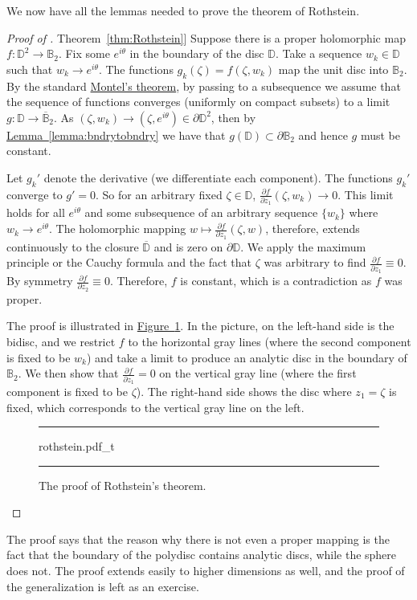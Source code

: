 \documentclass[12pt,openany]{book}
\newcommand{\D}{{\mathbb{D}}}
\newcommand{\bB}{{\mathbb{B}}}
\theoremstyle{plain}
\theoremstyle{remark}
\theoremstyle{definition}
\newenvironment{myfig}{%
\begin{figure}[h!t]
\noindent\rule{\textwidth}{0.5pt}\vspace{12pt}\par\centering}%
{\par\noindent\rule{\textwidth}{0.5pt}
\end{figure}}
\theoremstyle{exercise}
\theoremstyle{example}
\newcommand{\figureref}[1]{\hyperref[#1]{Figure~\ref*{#1}}}
\newcommand{\thmref}[1]{\hyperref[#1]{Theorem~\ref*{#1}}}
\newcommand{\lemmaref}[1]{\hyperref[#1]{Lemma~\ref*{#1}}}
\begin{document}
We now have all the lemmas needed to prove the theorem of Rothstein.

\begin{proof}[Proof of \thmref{thm:Rothstein}]
Suppose there is a proper holomorphic map $f \colon \D^2
\to \bB_2$.
Fix some $e^{i\theta}$ in the boundary of the disc $\D$.  Take a sequence
$w_k \in \D$ such that $w_k \to e^{i\theta}$.   The functions
$g_k(\zeta) =  f(\zeta,w_k)$ map the unit disc into $\bB_2$.  By the standard
\hyperref[thm:onevarmontel]{Montel's theorem}, by passing to a subsequence we assume that
the sequence of functions converges (uniformly on compact subsets) to
a limit $g \colon \D \to \overline{\bB}_2$.  As $(\zeta,w_k) \to
(\zeta,e^{i\theta}) \in \partial \D^2$, then by
\lemmaref{lemma:bndrytobndry} we have that $g(\D) \subset \partial \bB_2$
and hence $g$ must be constant.

Let $g_k'$ denote the derivative (we differentiate each component).
The functions $g_k'$ converge to $g' = 0$.
So for an arbitrary fixed $\zeta \in \D$,
$\frac{\partial f}{\partial z_1} (\zeta, w_k) \to 0$.
This limit holds for all $e^{i\theta}$ and some subsequence of
an arbitrary sequence $\{ w_k \}$ where $w_k \to e^{i\theta}$.  The
holomorphic mapping $w \mapsto \frac{\partial f}{\partial z_1} (\zeta, w)$,
therefore, extends continuously
to the closure $\overline{\D}$ and is zero on $\partial \D$.
We apply the maximum
principle or the Cauchy formula and the fact that $\zeta$ was arbitrary to find 
$\frac{\partial f}{\partial z_1} \equiv 0$.  By symmetry
$\frac{\partial f}{\partial z_2} \equiv 0$.  Therefore, $f$ is constant,
which is a contradiction as $f$ was proper.

The proof is illustrated in \figureref{fig:rothstein}.
In the picture, on the left-hand side is the bidisc, and we
restrict $f$ to the horizontal gray lines (where the second component is
fixed to be $w_k$) and take a limit to produce an analytic disc
in the boundary of $\bB_2$.  We then show that $\frac{\partial f}{\partial
z_1} = 0$ on the vertical gray line (where the first component is fixed to
be $\zeta$).  The right-hand side shows the disc where $z_1 = \zeta$ is
fixed, which corresponds to the vertical gray line on the left.
\begin{myfig}
{rothstein.pdf_t}
\caption{The proof of Rothstein's theorem.\label{fig:rothstein}}
\end{myfig}
\end{proof}

The proof says that the reason why there is not even a proper mapping is the fact
that the boundary of the polydisc contains analytic discs, while
the sphere does not.
The proof extends easily to higher dimensions as well, and the proof
of the generalization is left as an exercise.
\end{document}

